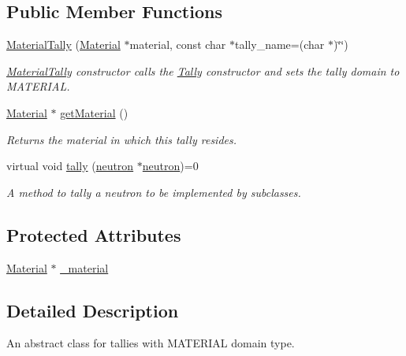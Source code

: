 \subsection*{Public Member Functions}
\begin{DoxyCompactItemize}
\item 
\hyperlink{classMaterialTally_a1401be513e221963f200bd241801c4d3}{Material\-Tally} (\hyperlink{classMaterial}{Material} $\ast$material, const char $\ast$tally\-\_\-name=(char $\ast$)\char`\"{}\char`\"{})
\begin{DoxyCompactList}\small\item\em \hyperlink{classMaterialTally}{Material\-Tally} constructor calls the \hyperlink{classTally}{Tally} constructor and sets the tally domain to M\-A\-T\-E\-R\-I\-A\-L. \end{DoxyCompactList}\item 
\hyperlink{classMaterial}{Material} $\ast$ \hyperlink{classMaterialTally_a97f01dd3748be423290db60d3e16d81f}{get\-Material} ()
\begin{DoxyCompactList}\small\item\em Returns the material in which this tally resides. \end{DoxyCompactList}\item 
\hypertarget{classMaterialTally_ab2debba62f51212ec8b39b7aeea3f54d}{virtual void \hyperlink{classMaterialTally_ab2debba62f51212ec8b39b7aeea3f54d}{tally} (\hyperlink{structneutron}{neutron} $\ast$\hyperlink{structneutron}{neutron})=0}\label{classMaterialTally_ab2debba62f51212ec8b39b7aeea3f54d}

\begin{DoxyCompactList}\small\item\em A method to tally a neutron to be implemented by subclasses. \end{DoxyCompactList}\end{DoxyCompactItemize}
\subsection*{Protected Attributes}
\begin{DoxyCompactItemize}
\item 
\hyperlink{classMaterial}{Material} $\ast$ \hyperlink{classMaterialTally_a7dcd60be3a3ccd3631aa2ef1cc3057ec}{\-\_\-material}
\end{DoxyCompactItemize}


\subsection{Detailed Description}
An abstract class for tallies with M\-A\-T\-E\-R\-I\-A\-L domain type. 

